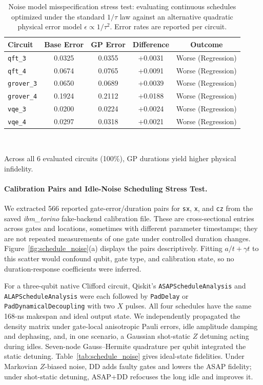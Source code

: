 \documentclass[10pt,letterpaper,journal]{IEEEtran}
\begin{document}
\begin{table}[t]
\centering\caption{Noise model misspecification stress test: evaluating continuous schedules optimized under the standard $1/\tau$ law against an alternative quadratic physical error model $\epsilon \propto 1/\tau^2$. Error rates are reported per circuit.}\label{tab:noise_misspecification}
\footnotesize\setlength{\tabcolsep}{3pt}
\begin{tabular}{lcccc}\toprule
Circuit & Base Error & GP Error & Difference & Outcome \\\midrule
\texttt{qft\_3}    & 0.0325 & 0.0355 & +0.0031 & Worse (Regression) \\
\texttt{qft\_4}    & 0.0674 & 0.0765 & +0.0091 & Worse (Regression) \\
\texttt{grover\_3} & 0.0650 & 0.0689 & +0.0039 & Worse (Regression) \\
\texttt{grover\_4} & 0.1924 & 0.2112 & +0.0188 & Worse (Regression) \\
\texttt{vqe\_3}    & 0.0200 & 0.0224 & +0.0024 & Worse (Regression) \\
\texttt{vqe\_4}    & 0.0297 & 0.0318 & +0.0021 & Worse (Regression) \\\bottomrule
\end{tabular}\\[2pt]
\parbox{0.96\columnwidth}{\scriptsize Across all 6 evaluated circuits (100\%), GP durations yield higher physical infidelity.}
\end{table}

\paragraph{Calibration Pairs and Idle-Noise Scheduling Stress Test.}
We extracted 566 reported gate-error/duration pairs for \texttt{sx}, \texttt{x}, and \texttt{cz} from the saved \emph{ibm\_torino} fake-backend calibration file. These are cross-sectional entries across gates and locations, sometimes with different parameter timestamps; they are not repeated measurements of one gate under controlled duration changes. Figure~\ref{fig:schedule_noise}(a) displays the pairs descriptively. Fitting $a/t+\gamma t$ to this scatter would confound qubit, gate type, and calibration state, so no duration-response coefficients were inferred.

For a three-qubit native Clifford circuit, Qiskit's \texttt{ASAPScheduleAnalysis} and \texttt{ALAPScheduleAnalysis} were each followed by \texttt{PadDelay} or \texttt{PadDynamicalDecoupling} with two $X$ pulses. All four schedules have the same 168-ns makespan and ideal output state. We independently propagated the density matrix under gate-local anisotropic Pauli errors, idle amplitude damping and dephasing, and, in one scenario, a Gaussian shot-static $Z$ detuning acting during idles. Seven-node Gauss--Hermite quadrature per qubit integrated the static detuning. Table~\ref{tab:schedule_noise} gives ideal-state fidelities. Under Markovian $Z$-biased noise, DD adds faulty gates and lowers the ASAP fidelity; under shot-static detuning, ASAP+DD refocuses the long idle and improves it.
\end{document}
